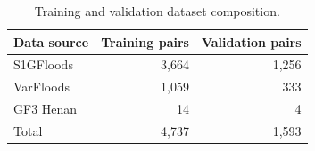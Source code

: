 \begin{table}[htbp]
\centering
\captionsetup{name=Table}
\caption{Training and validation dataset composition.}
\label{tab:training_split}
\small
\begin{tabular}{lrr}
\toprule
Data source & Training pairs & Validation pairs \\
\midrule
S1GFloods & 3,664 & 1,256 \\
VarFloods & 1,059 & 333 \\
GF3 Henan & 14 & 4 \\
\midrule
Total & 4,737 & 1,593 \\
\bottomrule
\end{tabular}
\end{table}
